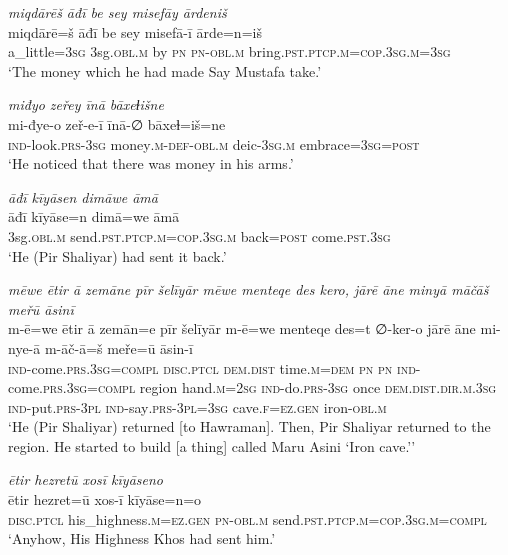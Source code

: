 \ea \label{ŽP.113}
\textit{miqdārēš āđī be sey misefāy ārdeniš} \\ 
\gll miqdārē=š āđī be sey misefā-ī ārde=n=iš \\ 
 a\_little\textsc{=3sg} 3sg\textsc{.obl}\textsc{.m} by \textsc{pn} \textsc{pn}\textsc{-obl}\textsc{.m} bring\textsc{.pst}\textsc{.ptcp}\textsc{.m}\textsc{=cop}\textsc{.3sg}\textsc{.m}\textsc{=3sg} \\ 
\glt `The money which he had made Say Mustafa take.'
\z 
 
\ea \label{ŽP.114}
\textit{miđyo zeřey īnā bāxeɫišne} \\ 
\gll mi-đye-o zeř-e-ī īnā-∅ bāxeɫ=iš=ne \\ 
 \textsc{ind-}look\textsc{.prs}\textsc{-3sg} money\textsc{.m}\textsc{-def}\textsc{-obl}\textsc{.m} deic\textsc{-3sg}\textsc{.m} embrace\textsc{=3sg}\textsc{=\textsc{post}} \\ 
\glt `He noticed that there was money in his arms.'
\z 
 
\ea \label{ŽP.115}
\textit{āđī kīyāsen dimāwe āmā} \\ 
\gll āđī kīyāse=n dimā=we āmā \\ 
 3sg\textsc{.obl}\textsc{.m} send\textsc{.pst}\textsc{.ptcp}\textsc{.m}\textsc{=cop}\textsc{.3sg}\textsc{.m} back\textsc{=\textsc{post}} come\textsc{.pst}\textsc{.3sg} \\ 
\glt `He (Pir Shaliyar) had sent it back.'
\z 
 
\ea \label{ŽP.116}
\textit{mēwe ētir ā zemāne pīr šelīyār mēwe menteqe des kero, jārē āne minyā māčāš meřū āsinī} \\ 
\gll m-ē=we ētir ā zemān=e pīr šelīyār m-ē=we menteqe des=t ∅-ker-o jārē āne mi-nye-ā m-āč-ā=š meře=ū āsin-ī \\ 
 \textsc{ind-}come\textsc{.prs}\textsc{.3sg}\textsc{=compl} \textsc{disc.ptcl} \textsc{dem.dist} time\textsc{.m}\textsc{=dem} \textsc{pn} \textsc{pn} \textsc{ind-}come\textsc{.prs}\textsc{.3sg}\textsc{=compl} region hand\textsc{.m}\textsc{=\textsc{2sg}} \textsc{ind-}do\textsc{.prs}\textsc{-3sg} once \textsc{dem.dist}\textsc{.dir}\textsc{.m}\textsc{.3sg} \textsc{ind-}put\textsc{.prs}\textsc{-3pl} \textsc{ind-}say\textsc{.prs}\textsc{-3pl}\textsc{=3sg} cave\textsc{.f}\textsc{\textsc{=ez.gen}} iron\textsc{-obl}\textsc{.m} \\ 
\glt `He (Pir Shaliyar) returned [to Hawraman]. Then, Pir Shaliyar returned to the region. He started to build [a thing] called Maru Asini ‘Iron cave.’'
\z 
 
\ea \label{ŽP.117}
\textit{ētir hezretū xosī kīyāseno} \\ 
\gll ētir hezret=ū xos-ī kīyāse=n=o \\ 
 \textsc{disc.ptcl} his\_highness\textsc{.m}\textsc{\textsc{=ez.gen}} \textsc{pn}\textsc{-obl}\textsc{.m} send\textsc{.pst}\textsc{.ptcp}\textsc{.m}\textsc{=cop}\textsc{.3sg}\textsc{.m}\textsc{=compl} \\ 
\glt `Anyhow, His Highness Khos had sent him.'
\z 
 
